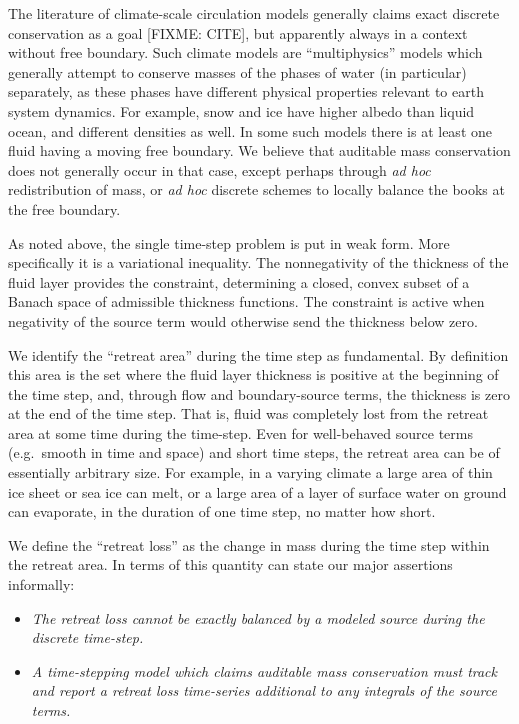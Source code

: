 \documentclass[final,leqno,onefignum,onetabnum]{siamltex1213bueler}
\begin{document}
The literature of climate-scale circulation models generally claims exact discrete conservation as a goal [FIXME: CITE], but apparently always in a context without free boundary.  Such climate models are ``multiphysics'' models which generally attempt to conserve masses of the phases of water (in particular) separately, as these phases have different physical properties relevant to earth system dynamics.  For example, snow and ice have higher albedo than liquid ocean, and different densities as well.  In some such models there is at least one fluid having a moving free boundary.  We believe that auditable mass conservation does not generally occur in that case, except perhaps through \emph{ad hoc} redistribution of mass, or \emph{ad hoc} discrete schemes to locally balance the books at the free boundary.

As noted above, the single time-step problem is put in weak form.  More specifically it is a variational inequality.  The nonnegativity of the thickness of the fluid layer provides the constraint, determining a closed, convex subset of a Banach space of admissible thickness functions.  The constraint is active when negativity of the source term would otherwise send the thickness below zero.

We identify the ``retreat area'' during the time step as fundamental.  By definition this area is the set where the fluid layer thickness is positive at the beginning of the time step, and, through flow and boundary-source terms, the thickness is zero at the end of the time step.  That is, fluid was completely lost from the retreat area at some time during the time-step.  Even for well-behaved source terms (e.g.~smooth in time and space) and short time steps, the retreat area can be of essentially arbitrary size.  For example, in a varying climate a large area of thin ice sheet or sea ice can melt, or a large area of a layer of surface water on ground can evaporate, in the duration of one time step, no matter how short.

We define the ``retreat loss'' as the change in mass during the time step within the retreat area.  In terms of this quantity can state our major assertions informally:\begin{itemize}
\item  \emph{The retreat loss cannot be \emph{exactly} balanced by a \emph{modeled} source during the discrete time-step.}
\item  \emph{A time-stepping model which claims auditable mass conservation must track and report a retreat loss time-series additional to any integrals of the source terms.}
\end{itemize}
\end{document}
